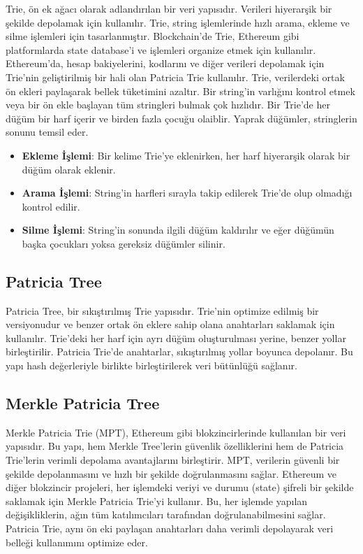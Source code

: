 Trie, ön ek ağacı olarak adlandırılan bir veri yapısıdır. Verileri hiyerarşik bir şekilde depolamak için kullanılır. Trie, string işlemlerinde hızlı arama, ekleme ve silme işlemleri için tasarlanmıştır. Blockchain'de Trie, Ethereum gibi platformlarda state database'i ve işlemleri organize etmek için kullanılır. Ethereum'da, hesap bakiyelerini, kodlarını ve diğer verileri depolamak için Trie'nin geliştirilmiş bir hali olan Patricia Trie kullanılır. Trie, verilerdeki ortak ön ekleri paylaşarak bellek tüketimini azaltır. Bir string'in varlığını kontrol etmek veya bir ön ekle başlayan tüm stringleri bulmak çok hızlıdır. Bir Trie'de her düğüm bir harf içerir ve birden fazla çocuğu olaiblir. Yaprak düğümler, stringlerin sonunu temsil eder.

\begin{itemize}
    \item \textbf{Ekleme İşlemi}: Bir kelime Trie'ye eklenirken, her harf hiyerarşik olarak bir düğüm olarak eklenir.
    \item \textbf{Arama İşlemi}: String’in harfleri sırayla takip edilerek Trie’de olup olmadığı kontrol edilir.
    \item \textbf{Silme İşlemi}: String’in sonunda ilgili düğüm kaldırılır ve eğer düğümün başka çocukları yoksa gereksiz düğümler silinir.
\end{itemize}

\newpage

\subsection{Patricia Tree}

Patricia Tree, bir sıkıştırılmış Trie yapısıdır. Trie'nin optimize edilmiş bir versiyonudur ve benzer ortak ön eklere sahip olana anahtarları saklamak için kullanılır. Trie'deki her harf için ayrı düğüm oluşturulması yerine, benzer yollar birleştirilir. Patricia Trie’de anahtarlar, sıkıştırılmış yollar boyunca depolanır. Bu yapı hash değerleriyle birlikte birleştirilerek veri bütünlüğü sağlanır.

\newpage

\subsection{Merkle Patricia Tree}

Merkle Patricia Trie (MPT), Ethereum gibi blokzincirlerinde kullanılan bir veri yapısıdır. Bu yapı, hem Merkle Tree'lerin güvenlik özelliklerini hem de Patricia Trie'lerin verimli depolama avantajlarını birleştirir. MPT, verilerin güvenli bir şekilde depolanmasını ve hızlı bir şekilde doğrulanmasını sağlar. Ethereum ve diğer blokzincir projeleri, her işlemdeki veriyi ve durumu (state) şifreli bir şekilde saklamak için Merkle Patricia Trie'yi kullanır. Bu, her işlemde yapılan değişikliklerin, ağın tüm katılımcıları tarafından doğrulanabilmesini sağlar. Patricia Trie, aynı ön eki paylaşan anahtarları daha verimli depolayarak veri belleği kullanımını optimize eder.

